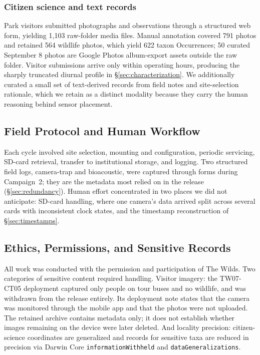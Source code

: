 \documentclass[sigconf]{acmart}
\begin{document}
\subsubsection{Citizen science and text records}
Park visitors submitted photographs and observations through a
structured web form, yielding 1{,}103 raw-folder media files. Manual annotation
covered 791 photos and retained 564 wildlife photos, which yield 622 taxon
Occurrences; 50 curated September 8 photos are Google Photos album-export assets
outside the raw folder. Visitor submissions arrive only within operating hours,
producing the sharply truncated
diurnal profile in \S\ref{sec:characterization}. We additionally
curated a small set of text-derived records from field notes and
site-selection rationale, which we retain as a distinct modality
because they carry the human reasoning behind sensor placement.

\subsection{Field Protocol and Human Workflow}

Each cycle involved site selection, mounting and configuration,
periodic servicing, SD-card retrieval, transfer to institutional
storage, and logging. Two structured field logs, camera-trap and
bioacoustic, were captured through forms during Campaign~2; they are the
metadata most relied on in the release (\S\ref{sec:redundancy}). Human effort concentrated in two places we did
not anticipate: SD-card handling, where one camera's data arrived split
across several cards with inconsistent clock states, and the timestamp
reconstruction of \S\ref{sec:timestamps}.

\subsection{Ethics, Permissions, and Sensitive Records}

All work was conducted with the permission and participation of The
Wilds. Two categories of sensitive content required handling. Visitor
imagery: the TW07-CT05 deployment captured only people on tour buses and
no wildlife, and was withdrawn from the release entirely. Its deployment note
states that the camera was monitored through the mobile app and that the photos
were not uploaded. The retained archive contains metadata only; it does not
establish whether images remaining on the device were later deleted. And locality precision: citizen-science
coordinates are generalized and records for sensitive taxa are reduced
in precision via Darwin Core \texttt{informationWithheld} and
\texttt{dataGeneralizations}.
\end{document}
